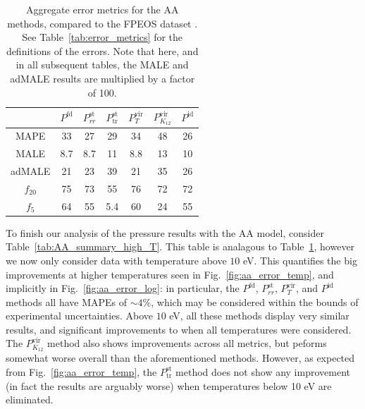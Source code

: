 \documentclass[%
 preprint,
 superscriptaddress,
 amsmath,amssymb,
longbibliography,
]{revtex4-2}
\newcommand{\Pfd}{P^\textrm{fd}}
\newcommand{\Pstrr}{P^\textrm{st}_{rr}}
\newcommand{\Psttr}{P^\textrm{st}_\textrm{tr}}
\newcommand{\Pvirt}{P^\textrm{vir}_T}
\newcommand{\Pvirk}{P^\textrm{vir}_{K_{12}}}
\newcommand{\Pid}{P^\textrm{id}}
\begin{document}
\begin{table}[]
    \centering
    \begin{tabular}{ccccccc}
        \toprule
         & $\Pfd$ & $\Pstrr$ & $\Psttr$ & $\Pvirt$ & $\Pvirk$ & $\Pid$ \\ \midrule
        MAPE & 33 & 27 & 29 & 34 & 48 & 26 \\
        MALE & 8.7 & 8.7 & 11 & 8.8 & 13 & 10 \\
        adMALE & 21 & 23 & 39 & 21 & 35 & 26 \\
        $f_{20}$ & 75 & 73 & 55 & 76 & 72 & 72 \\
        $f_{5}$ & 64 & 55 & 5.4 & 60 & 24 & 55 \\
        \bottomrule
    \end{tabular}
    \caption{Aggregate error metrics for the AA methods, compared to the FPEOS dataset \cite{Militzer_EOS_database}. See Table~\ref{tab:error_metrics} for the definitions of the errors. Note that here, and in all subsequent tables, the MALE and adMALE results are multiplied by a factor of 100.}
    \label{tab:AA_summary}
\end{table}

To finish our analysis of the pressure results with the AA model, consider Table~\ref{tab:AA_summary_high_T}. This table is analagous to Table~\ref{tab:AA_summary}, however we now only consider data with temperature above $10$ eV. This quantifies the big improvements at higher temperatures seen in Fig.~\ref{fig:aa_error_temp}, and implicitly in Fig.~\ref{fig:aa_error_log}: in particular, the $\Pfd$, $\Pstrr$, $\Pvirt$, and $\Pid$ methods all have MAPEs of $\sim 4\%$, which may be considered within the bounds of experimental uncertainties. Above $10$ eV, all these methods display very similar results, and significant improvements to when all temperatures were considered. The $\Pvirk$ method also shows improvements across all metrics, but peforms somewhat worse overall than the aforementioned methods. However, as expected from Fig.~\ref{fig:aa_error_temp}, the $\Psttr$ method does not show any improvement (in fact the results are arguably worse) when temperatures below 10 eV are eliminated.
\end{document}
